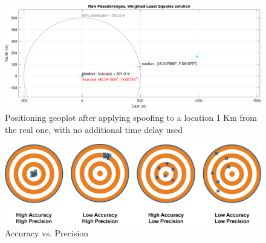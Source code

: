 \begin{figure}[H]
    \centering
    \includegraphics[width=1.00
    \linewidth]{images/pos_spoofed_no_delay.pdf}
    \caption{Positioning geoplot after applying spoofing to a location 1 Km from the real one, with no additional time delay used}
    \label{fig:pos_spoofed_no_delay}
\end{figure}

\begin{figure}[H]
    \centering
    \includegraphics[width=0.50
    \linewidth]{images/Accuracy-vs-precision1.jpg}
    \caption{Accuracy vs. Precision}
    \label{fig:accPos}
\end{figure}



